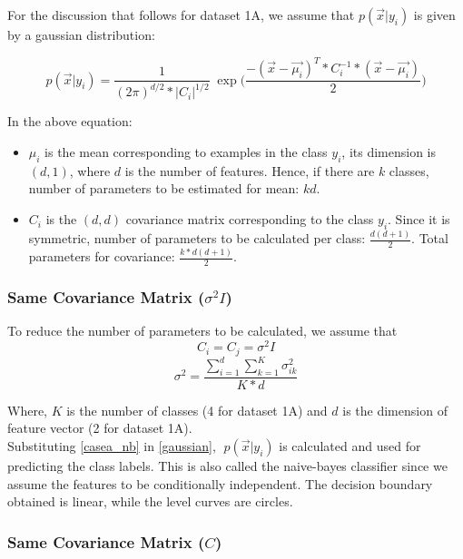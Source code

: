 \documentclass[11pt,a4paper]{article}
\newcommand{\noi}{\noindent}
\begin{document}
\noi
For the discussion that follows for dataset 1A, we assume that $p(\vec{x}|y_{i})$ is given by a gaussian distribution:

\begin{equation}
\label{gaussian}
    p(\vec{x}|y_{i})=\frac{1}{(2\pi)^{d/2}*|C_{i}|^{1/2}}\;\exp{\Big(\frac{-(\vec{x}-\vec{\mu_{i}})^{T}*C_{i}^{-1}*(\vec{x}-\vec{\mu_{i}})}{2}}\Big)
\end{equation}

\noi
In the above equation: 

\begin{itemize}
    \item $\mu_{i}$ is the mean corresponding to examples in the class $y_{i}$, its dimension is $(d,1)$, where $d$ is the number of features. Hence, if there are $k$ classes, number of parameters to be estimated for mean: $kd$.
    \item $C_{i}$ is the $(d,d)$ covariance matrix corresponding to the class $y_{i}$. Since it is symmetric, number of parameters to be calculated per class: $\frac{d(d+1)}{2}$. Total parameters for covariance: $\frac{k*d(d+1)}{2}$.
\end{itemize}

\subsubsection{Same Covariance Matrix ($\sigma^2I$)}

To reduce the number of parameters to be calculated, we assume that
\begin{equation}
    C_{i}=C_{j}=\sigma^{2}I
\end{equation}
\begin{equation}
\label{casea_nb}
    \sigma^{2}=\frac{\sum_{i=1}^{d}\sum_{k=1}^{K}\sigma^{2}_{ik}}{K*d}
\end{equation}

\noi
Where, $K$ is the number of classes (4 for dataset 1A) and $d$ is the dimension of feature vector (2 for dataset 1A). \\

\noi
Substituting \autoref{casea_nb} in \autoref{gaussian}, $\;p(\vec{x}|y_{i})$ is calculated and used for predicting the class labels. 
This is also called the naive-bayes classifier since we assume the features to be conditionally independent. 
The decision boundary obtained is linear, while the level curves are circles. 

\subsubsection{Same Covariance Matrix ($C$)}
\end{document}
